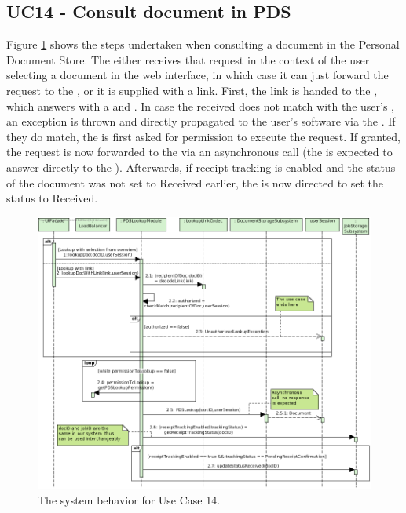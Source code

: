 \subsection{UC14 - Consult document in PDS}
Figure \ref{fig:seq_uc14} shows the steps undertaken when consulting a document in the Personal Document Store. The  either receives that request in the context of the user selecting a document in the web interface, in which case it can just forward the request to the , or it is supplied with a link. First, the link is handed to the  , which answers with a  and . In case the received  does not match with the user's , an exception is thrown and directly propagated to the user's software via the . If they do match, the  is first asked for permission to execute the request. If granted, the request is now forwarded to the  via an asynchronous call (the  is expected to answer directly to the ). Afterwards, if receipt tracking is enabled and the status of the document was not set to Received earlier, the  is now directed to set the status to Received.

\begin{figure}[!htp]
    \centering
    \includegraphics[width=\textwidth]{figures/UC14 - Consult document in PDS.png}
    \caption{The system behavior for Use Case 14.
        }\label{fig:seq_uc14}
\end{figure}

